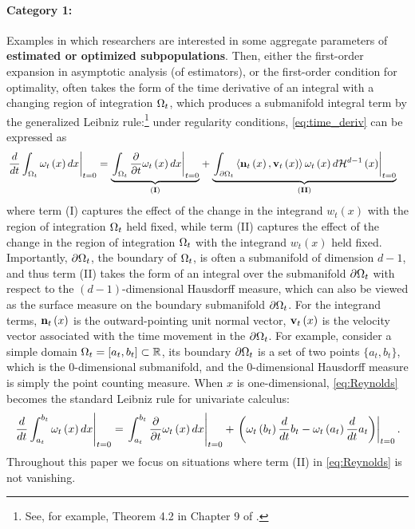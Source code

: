 \documentclass[12pt,american]{article}
\theoremstyle{definition}
\theoremstyle{plain}
\theoremstyle{definition}
\theoremstyle{plain}
\theoremstyle{plain}
\theoremstyle{plain}
\theoremstyle{plain}
\theoremstyle{plain}
\newcommand{\R}{\mathbb{R}}
\begin{document}
\paragraph{Category 1:} Examples in which researchers are interested in some aggregate parameters
of \textbf{estimated or optimized subpopulations}. Then, either the
first-order expansion in asymptotic analysis (of estimators), or the
first-order condition for optimality, often takes the form of the
time derivative of an integral with a changing region of integration
$\Omega_{t}$, which produces a submanifold integral term by the generalized
Leibniz rule:\footnote{See, for example, Theorem 4.2 in Chapter 9 of \cite{delfour2001shapes}.}  under regularity conditions, \eqref{eq:time_deriv} can be expressed as
\begin{align}
  \left.\frac{d}{dt}\int_{\Omega_{t}}\omega_{t}\left(x\right)dx\right|_{t=0} & =\underset{({\bf I})}{\underbrace{\left.\int_{\Omega_{t}}\frac{\partial}{\partial t}\omega_{t}\left(x\right)dx\right|_{t=0}}}+\underset{\left({\bf II}\right)}{\underbrace{\left.\int_{\partial\Omega_{t}}\left\langle {\bf n}_{t}\left(x\right),{\bf v}_{t}\left(x\right)\right\rangle \omega_{t}\left(x\right)d\mathcal{H}^{d-1}\left(x\right)\right|_{t=0}}}\label{eq:Reynolds}
\end{align}
where term (I) captures the effect of the change in the integrand
$w_{t}\left(x\right)$ with the region of integration $\Omega_{t}$ held
fixed, while term (II) captures the effect of the change in the region
of integration $\Omega_{t}$ with the integrand $w_{t}\left(x\right)$
held fixed. Importantly, $\partial\Omega_{t}$, the boundary of $\Omega_{t}$, is often a submanifold of dimension $d-1$, and thus term (II) takes the form of an integral over the submanifold $\partial\Omega_t$ with respect to the $(d-1)$-dimensional Hausdorff measure, which can also be viewed as the surface measure on the boundary submanifold $\partial\Omega_t$. For the integrand terms,
${\bf n}_{t}\left(x\right)$ is the outward-pointing unit normal vector,
${\bf v}_{t}\left(x\right)$ is the velocity vector associated with
the time movement in the $\partial\Omega_{t}$. For example,
consider a simple domain $\O_{t}=\left[a_{t},b_{t}\right]\subset\R$, its boundary $\partial\Omega_t$ is a set of two points $\{a_t,b_t\}$, which is the $0$-dimensional submanifold, and the $0$-dimensional Hausdorff measure is simply the point counting measure. When $x$ is one-dimensional, \eqref{eq:Reynolds} becomes the standard Leibniz rule for univariate calculus:
\[
  \left.\frac{d}{dt}\int_{a_{t}}^{b_{t}}\omega_{t}\left(x\right)dx\right|_{t=0}=\left.\int_{a_{t}}^{b_{t}}\frac{\partial}{\partial t}\omega_{t}\left(x\right)dx\right|_{t=0}+\left.\left(\omega_{t}\left(b_{t}\right)\frac{d}{dt}b_{t}-\omega_{t}\left(a_{t}\right)\frac{d}{dt}a_{t}\right)\right|_{t=0}.
\]
Throughout this paper we focus on situations where term (II) in \eqref{eq:Reynolds} is not vanishing.
\end{document}
